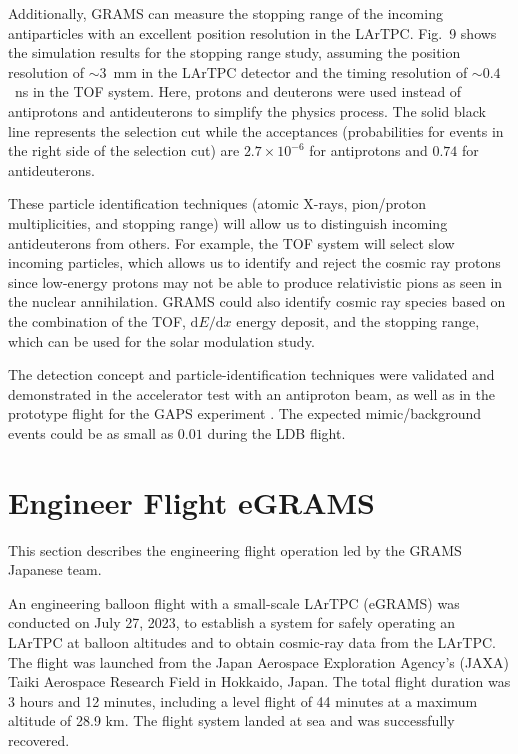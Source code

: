 Additionally, GRAMS can measure the stopping range of the incoming antiparticles with an excellent position resolution in the LArTPC. Fig.~9 shows the simulation results for the stopping range study, assuming the position resolution of $\sim 3$~mm in the LArTPC detector and the timing resolution of $\sim 0.4$~ns in the TOF system. Here, protons and deuterons were used instead of antiprotons and antideuterons to simplify the physics process. The solid black line represents the selection cut while the acceptances (probabilities for events in the right side of the selection cut) are $2.7 \times 10^{-6}$ for antiprotons and $0.74$ for antideuterons.

These particle identification techniques (atomic X-rays, pion/proton multiplicities, and stopping range) will allow us to distinguish incoming antideuterons from others. For example, the TOF system will select slow incoming particles, which allows us to identify and reject the cosmic ray protons since low-energy protons may not be able to produce relativistic pions as seen in the nuclear annihilation. GRAMS could also identify cosmic ray species based on the combination of the TOF, $\mathrm{d}E/\mathrm{d}x$ energy deposit, and the stopping range, which can be used for the solar modulation study.

The detection concept and particle-identification techniques were validated and demonstrated in the accelerator test with an antiproton beam, as well as in the prototype flight for the GAPS experiment \cite{aramaki2013measurement,VONDOETINCHEM201493,MOGNET201424, FUKE20141432}. The expected mimic/background events could be as small as $0.01$ during the LDB flight.

\section{Engineer Flight eGRAMS}
\label{chap:GRAMS:eGRAMS}
This section describes the engineering flight operation led by the \ac{GRAMS} Japanese team.

An engineering balloon flight with a small-scale LArTPC (eGRAMS) was conducted on July 27, 2023, to establish a system for safely operating an LArTPC at balloon altitudes and to obtain cosmic-ray data from the LArTPC. The flight was launched from the Japan Aerospace Exploration Agency’s (JAXA) Taiki Aerospace Research Field in Hokkaido, Japan. The total flight duration was 3 hours and 12 minutes, including a level flight of 44 minutes at a maximum altitude of 28.9 km. The flight system landed at sea and was successfully recovered.

